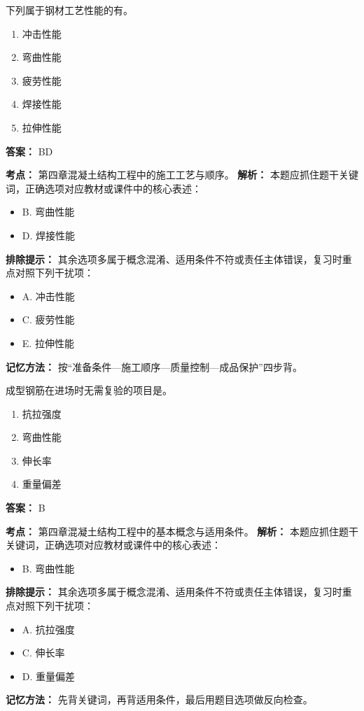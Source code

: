 \documentclass[UTF8,fontset=fandol,11pt]{ctexart}
\begin{document}
\begin{quizbox}[title={第 4 题}]
下列属于钢材工艺性能的有。\\
\begin{enumerate}[label=\Alph*.]
\item 冲击性能
\item 弯曲性能
\item 疲劳性能
\item 焊接性能
\item 拉伸性能
\end{enumerate}
\textbf{答案：} BD
\vspace{0.25em}
\begin{answerbox}[title={考点解析}]
\textbf{考点：} 第四章混凝土结构工程中的施工工艺与顺序。
\textbf{解析：} 本题应抓住题干关键词，正确选项对应教材或课件中的核心表述：
\begin{itemize}
\item B. 弯曲性能
\item D. 焊接性能
\end{itemize}
\textbf{排除提示：} 其余选项多属于概念混淆、适用条件不符或责任主体错误，复习时重点对照下列干扰项：
\begin{itemize}
\item A. 冲击性能
\item C. 疲劳性能
\item E. 拉伸性能
\end{itemize}
\textbf{记忆方法：} 按“准备条件—施工顺序—质量控制—成品保护”四步背。
\end{answerbox}
\end{quizbox}

\vspace{0.2em}

\begin{quizbox}[title={第 5 题}]
成型钢筋在进场时无需复验的项目是。\\
\begin{enumerate}[label=\Alph*.]
\item 抗拉强度
\item 弯曲性能
\item 伸长率
\item 重量偏差
\end{enumerate}
\textbf{答案：} B
\vspace{0.25em}
\begin{answerbox}[title={考点解析}]
\textbf{考点：} 第四章混凝土结构工程中的基本概念与适用条件。
\textbf{解析：} 本题应抓住题干关键词，正确选项对应教材或课件中的核心表述：
\begin{itemize}
\item B. 弯曲性能
\end{itemize}
\textbf{排除提示：} 其余选项多属于概念混淆、适用条件不符或责任主体错误，复习时重点对照下列干扰项：
\begin{itemize}
\item A. 抗拉强度
\item C. 伸长率
\item D. 重量偏差
\end{itemize}
\textbf{记忆方法：} 先背关键词，再背适用条件，最后用题目选项做反向检查。
\end{answerbox}
\end{quizbox}
\end{document}
